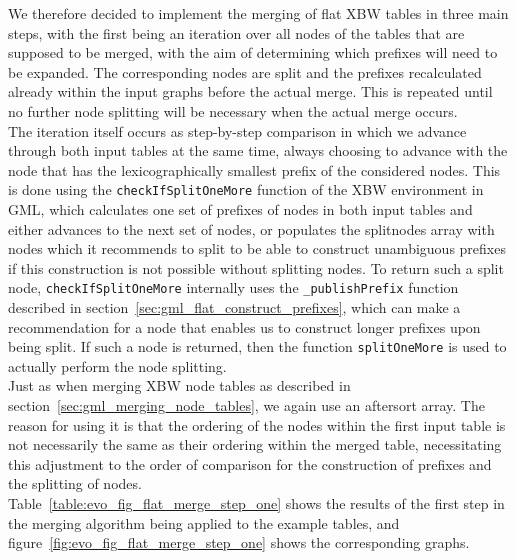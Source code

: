 \documentclass[a4paper,12pt,twoside,BCOR=10mm]{scrbook}
\begin{document}
We therefore decided to implement the merging of flat XBW tables in three main steps,
with the first being an iteration over all nodes of the tables that are supposed to be merged,
with the aim of determining which prefixes will need to be expanded. The corresponding nodes are
split and the prefixes recalculated already within the input graphs before the actual merge.
This is repeated until no further node splitting will be necessary when the actual
merge occurs. \\
The iteration itself occurs as step-by-step comparison in which we advance through
both input tables at the same time, always choosing to advance with the node that has the lexicographically
smallest prefix of the considered nodes.
This is done using the \texttt{checkIfSplitOneMore} function of the XBW environment in GML,
which calculates one set of prefixes of nodes in both input tables
and either advances to the next set of nodes, or populates the splitnodes array
with nodes which it recommends to split to be able to construct unambiguous prefixes if this
construction is not possible without splitting nodes.
To return such a split node, \texttt{checkIfSplitOneMore} internally uses the \texttt{\_publishPrefix} function
described in section~\ref{sec:gml_flat_construct_prefixes}, which can make a recommendation for a
node that enables us to construct longer prefixes upon being split.
If such a node is returned, then the function \texttt{splitOneMore} is used to actually
perform the node splitting. \\
Just as when merging XBW node tables as described in section~\ref{sec:gml_merging_node_tables},
we again use an aftersort array.
The reason for using it is that the ordering of the nodes within the first input table is not necessarily the
same as their ordering within the merged table, necessitating this adjustment to the order of comparison
for the construction of prefixes and the splitting of nodes. \\
Table~\ref{table:evo_fig_flat_merge_step_one} shows the results of the first step in the merging algorithm being applied
to the example tables, and figure~\ref{fig:evo_fig_flat_merge_step_one} shows the corresponding graphs.
\end{document}
